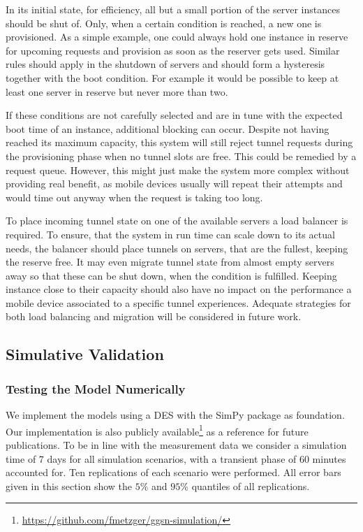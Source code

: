 In its initial state, for efficiency, all but a small portion of the server instances should be shut of. Only, when a certain condition is reached, a new one is provisioned. As a simple example, one could always hold one instance in reserve for upcoming requests and provision as soon as the reserver gets used. Similar rules should apply in the shutdown of servers and should form a hysteresis together with the boot condition. For example it would be possible to keep at least one server in reserve but never more than two.

If these conditions are not carefully selected and are in tune with the expected boot time of an instance, additional blocking can occur. Despite not having reached its maximum capacity, this system will still reject tunnel requests during the provisioning phase when no tunnel slots are free. This could be remedied by a request queue. However, this might just make the system more complex without providing real benefit, as mobile devices usually will repeat their attempts and would time out anyway when the request is taking too long. 

To place incoming tunnel state on one of the available servers a load balancer is required. To ensure, that the system in run time can scale down to its actual needs, the balancer should place tunnels on servers, that are the fullest, keeping the reserve free. It may even migrate tunnel state from almost empty servers away so that these can be shut down, when the condition is fulfilled. Keeping instance close to their capacity should also have no impact on the performance a mobile device associated to a specific tunnel experiences. Adequate strategies for both load balancing and migration will be considered in future work.




\subsection{Simulative Validation} 


\subsubsection{Testing the Model Numerically}
\label{c4:sec:model-numerical}

We implement the models using a \gls{DES} with the SimPy \cite{simpy} package as foundation. Our implementation is also publicly available\footnote{\url{https://github.com/fmetzger/ggsn-simulation/}} as a reference for future publications. To be in line with the measurement data we consider a simulation time of 7 days for all simulation scenarios, with a transient phase of 60 minutes accounted for. Ten replications of each scenario were performed. All error bars given in this section show the $5\%$ and $95\%$ quantiles of all replications.


